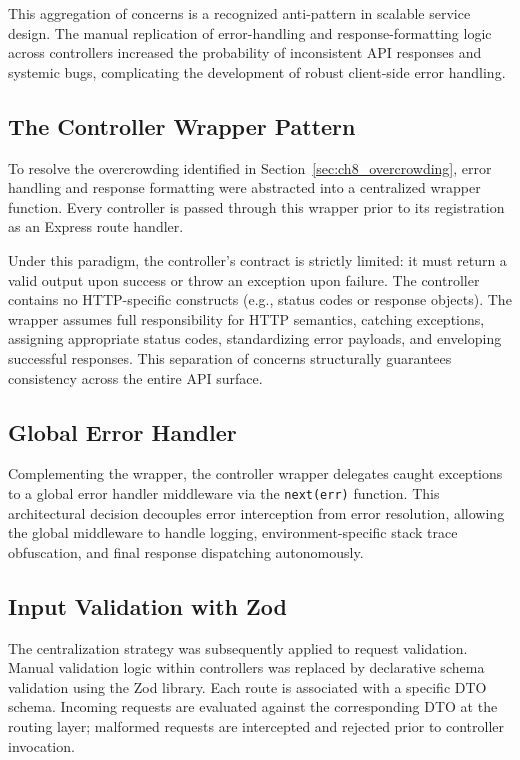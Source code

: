 This aggregation of concerns is a recognized anti-pattern in scalable service design. The manual replication of error-handling and response-formatting logic across controllers increased the probability of inconsistent API responses and systemic bugs, complicating the development of robust client-side error handling.

\subsection{The Controller Wrapper Pattern}
\label{sec:ch8_wrapper}

To resolve the overcrowding identified in Section~\ref{sec:ch8_overcrowding}, error handling and response formatting were abstracted into a centralized wrapper function. Every controller is passed through this wrapper prior to its registration as an Express route handler.

Under this paradigm, the controller's contract is strictly limited: it must return a valid output upon success or throw an exception upon failure. The controller contains no HTTP-specific constructs (e.g., status codes or response objects). The wrapper assumes full responsibility for HTTP semantics, catching exceptions, assigning appropriate status codes, standardizing error payloads, and enveloping successful responses. This separation of concerns structurally guarantees consistency across the entire API surface.

\subsection{Global Error Handler}
\label{sec:ch8_error_handler}

Complementing the wrapper, the controller wrapper delegates caught exceptions to a global error handler middleware via the \texttt{next(err)} function. This architectural decision decouples error interception from error resolution, allowing the global middleware to handle logging, environment-specific stack trace obfuscation, and final response dispatching autonomously.

\subsection{Input Validation with Zod}
\label{sec:ch8_zod}

The centralization strategy was subsequently applied to request validation. Manual validation logic within controllers was replaced by declarative schema validation using the Zod library. Each route is associated with a specific DTO schema. Incoming requests are evaluated against the corresponding DTO at the routing layer; malformed requests are intercepted and rejected prior to controller invocation.

